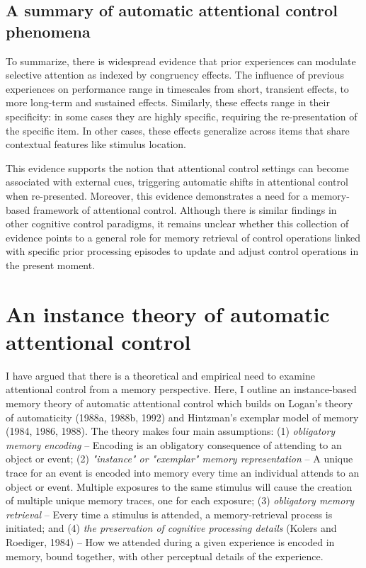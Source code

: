 \documentclass[]{DissertateCUNY}
\begin{document}
\hypertarget{a-summary-of-automatic-attentional-control-phenomena}{%
\subsection{A summary of automatic attentional control
phenomena}\label{a-summary-of-automatic-attentional-control-phenomena}}

To summarize, there is widespread evidence that prior experiences can
modulate selective attention as indexed by congruency effects. The
influence of previous experiences on performance range in timescales
from short, transient effects, to more long-term and sustained effects.
Similarly, these effects range in their specificity: in some cases they
are highly specific, requiring the re-presentation of the specific item.
In other cases, these effects generalize across items that share
contextual features like stimulus location.

This evidence supports the notion that attentional control settings can
become associated with external cues, triggering automatic shifts in
attentional control when re-presented. Moreover, this evidence
demonstrates a need for a memory-based framework of attentional control.
Although there is similar findings in other cognitive control paradigms,
it remains unclear whether this collection of evidence points to a
general role for memory retrieval of control operations linked with
specific prior processing episodes to update and adjust control
operations in the present moment.

\hypertarget{an-instance-theory-of-automatic-attentional-control}{%
\section{An instance theory of automatic attentional
control}\label{an-instance-theory-of-automatic-attentional-control}}

I have argued that there is a theoretical and empirical need to examine
attentional control from a memory perspective. Here, I outline an
instance-based memory theory of automatic attentional control which
builds on Logan's theory of automaticity (1988a, 1988b, 1992) and
Hintzman's exemplar model of memory (1984, 1986, 1988). The theory makes
four main assumptions: (1) \textit{obligatory memory encoding} --
Encoding is an obligatory consequence of attending to an object or
event; (2) \textit{"instance" or "exemplar" memory representation} -- A
unique trace for an event is encoded into memory every time an
individual attends to an object or event. Multiple exposures to the same
stimulus will cause the creation of multiple unique memory traces, one
for each exposure; (3) \textit{obligatory memory retrieval} -- Every
time a stimulus is attended, a memory-retrieval process is initiated;
and (4) \textit{the preservation of cognitive processing details}
(Kolers and Roediger, 1984) -- How we attended during a given experience
is encoded in memory, bound together, with other perceptual details of
the experience.
\end{document}
